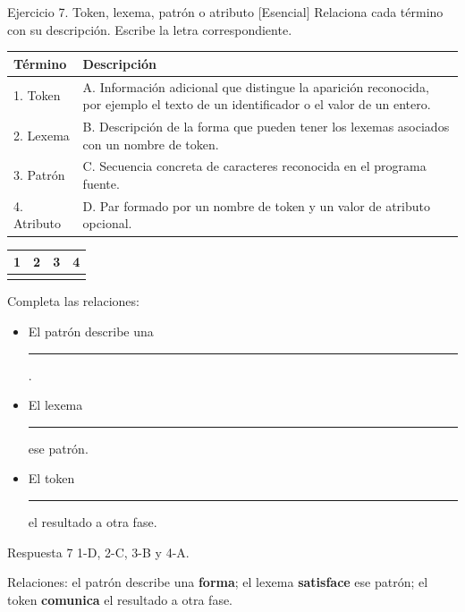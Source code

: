 \documentclass[11pt,spanish]{article}
\newcommand{\blank}[1][4cm]{\rule{#1}{0.4pt}}
\begin{document}
\begin{ejercicio}{Ejercicio 7. Token, lexema, patrón o atributo \hfill {\small [Esencial]}}
Relaciona cada término con su descripción. Escribe la letra correspondiente.

\begin{center}
\small
\begin{tabular}{|p{}|p{}|}
\hline
\textbf{Término} & \textbf{Descripción} \tabularnewline
\hline
1. Token & A. Información adicional que distingue la aparición reconocida, por ejemplo el texto de un identificador o el valor de un entero. \tabularnewline
\hline
2. Lexema & B. Descripción de la forma que pueden tener los lexemas asociados con un nombre de token. \tabularnewline
\hline
3. Patrón & C. Secuencia concreta de caracteres reconocida en el programa fuente. \tabularnewline
\hline
4. Atributo & D. Par formado por un nombre de token y un valor de atributo opcional. \tabularnewline
\hline
\end{tabular}
\end{center}

\begin{center}
\begin{tabular}{|c|c|c|c|}
\hline
1 & 2 & 3 & 4 \tabularnewline
\hline
\phantom{D} & \phantom{C} & \phantom{B} & \phantom{A} \tabularnewline[0.45cm]
\hline
\end{tabular}
\end{center}

Completa las relaciones:

\begin{itemize}[leftmargin=*]
    \item El patrón describe una \blank[4cm].
    \item El lexema \blank[4cm] ese patrón.
    \item El token \blank[4cm] el resultado a otra fase.
\end{itemize}
\end{ejercicio}

\ifrespuestas
\begin{respuesta}{Respuesta 7}
1-D, 2-C, 3-B y 4-A.

Relaciones: el patrón describe una \textbf{forma}; el lexema \textbf{satisface} ese patrón; el token \textbf{comunica} el resultado a otra fase.
\end{respuesta}
\fi
\end{document}

